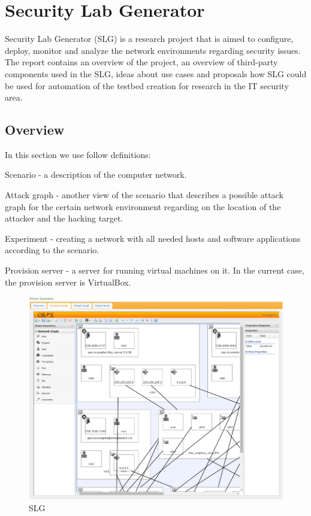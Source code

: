 %


\section{Security Lab Generator}
Security Lab Generator (SLG) is a research project that is aimed to configure, deploy, monitor and analyze the network environments regarding security issues. The report contains an overview of the project, an overview of third-party components used in the SLG, ideas about use cases and proposals how SLG could be used for automation of the testbed creation for research in the IT security area.

\subsection{Overview}

In this section we use follow definitions:
\begin{compactitem}
\item Scenario - a description of the computer network. 
\item Attack graph - another view of the scenario that describes a possible attack graph for the certain network environment regarding on the location of the attacker and the hacking target.   
\item Experiment - creating a network with all needed hosts and software applications according to the scenario.
\item Provision server - a server for running virtual machines on it. In the current case, the provision server is VirtualBox.
\end{compactitem}

\begin{figure}[ht!]
\centering
\includegraphics[width=\textwidth]{slg.png}
\caption{SLG}
\label{overflow}
\end{figure} 

